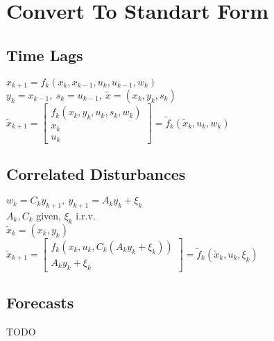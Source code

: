 \section*{Convert To Standart Form}
\subsection*{Time Lags}
$x_{k+1} = f_k(x_k,x_{k-1}, u_k, u_{k-1}, w_k)$\\
$y_k = x_{k-1}, \ s_k=u_{k-1}, \ \widetilde{x} = (x_k,y_k,s_k)$\\
$\widetilde{x}_{k+1} = \left[\begin{matrix}f_k(x_k,y_k,u_k,s_k,w_k)\\x_k\\u_k \end{matrix}\right] = \widetilde{f}_k(\widetilde{x}_k,u_k,w_k)$
\subsection*{Correlated Disturbances}
$w_k = C_k y_{k+1}, \ y_{k+1} = A_k y_k + \xi_k$\\
$A_k, C_k$ given, $\xi_k$ i.r.v.\\
$\widetilde{x}_k = (x_k, y_k)$\\
$\widetilde{x}_{k+1} = \left[\begin{matrix}f_k(x_k,u_k,C_k(A_ky_k + \xi_k))\\A_ky_k + \xi_k \end{matrix}\right] = \widetilde{f}_k(\widetilde{x}_k,u_k,\xi_k)$
\subsection*{Forecasts}
TODO
